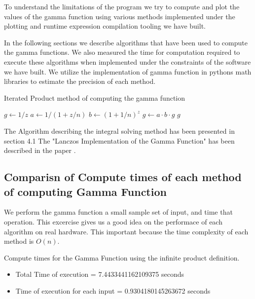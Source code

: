 \documentclass[12pt]{article}
\begin{document}
To understand the limitations of the program we try to compute and plot the values of the gamma function using
various methods implemented under the plotting and runtime expression compilation tooling we have built.

In the following sections we describe algorithms that have been used to compute the gamma functions. We also
measured the time for computation required to execute these algorithms when implemented under the constraints
of the software we have built. We utilize the implementation of gamma function in pythons math libraries 
to estimate the precision of each method.

\begin{algorithm}
	\caption{Iterated Product method of computing the gamma function}
	\begin{algorithmic}[1]
	\State $g \gets 1 / z$
	\State $a \gets 1 / (1 + z/n)$
	\State $b \gets (1 + 1/n)^z$
	\State $g \gets a \cdot b \cdot g$
	\EndFor
	\State \Return $g$
	\EndProcedure
	\end{algorithmic}
\end{algorithm}

The Algorithm describing the integral solving method has been presented in section 4.1
The "Lanczos Implementation of the Gamma Function" has been described in the paper \cite{aa}.

\pagebreak
\subsection{Comparisn of Compute times of each method of computing Gamma Function}

We perform the gamma function a small sample set of input, and time that operation. This excercise gives us a good idea on the performace of each algorithm
on real hardware. This important because the time complexity of each method is $O(n)$.
\\

\begin{bf}
	\flushleft
	Compute times for the Gamma Function using the infinite product definition.
\end{bf}

\begin{itemize}
	\item Total Time of execution = 7.4433441162109375 seconds
	\item Time of execution for each input = 0.9304180145263672 seconds
\end{itemize}
\end{document}
